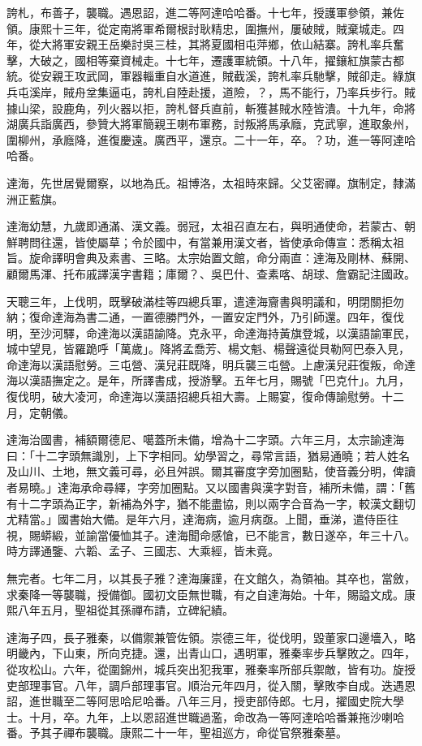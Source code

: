\begin{pinyinscope}
誇札，布善子，襲職。遇恩詔，進二等阿達哈哈番。十七年，授護軍參領，兼佐領。康熙十三年，從定南將軍希爾根討耿精忠，圍撫州，屢破賊，賊棄城走。四年，從大將軍安親王岳樂討吳三桂，其將夏國相屯萍鄉，依山結寨。誇札率兵奮擊，大破之，國相等棄資械走。十七年，遷護軍統領。十八年，擢鑲紅旗蒙古都統。從安親王攻武岡，軍器輜重自水道進，賊截溪，誇札率兵馳擊，賊卻走。綠旗兵屯溪岸，賊舟坌集逼屯，誇札自陸赴援，道險，？，馬不能行，乃率兵步行。賊據山梁，設鹿角，列火器以拒，誇札督兵直前，斬獲甚賊水陸皆潰。十九年，命將湖廣兵詣廣西，參贊大將軍簡親王喇布軍務，討叛將馬承廕，克武寧，進取象州，圍柳州，承廕降，進復慶遠。廣西平，還京。二十一年，卒。？功，進一等阿達哈哈番。

達海，先世居覺爾察，以地為氏。祖博洛，太祖時來歸。父艾密禪。旗制定，隸滿洲正藍旗。

達海幼慧，九歲即通滿、漢文義。弱冠，太祖召直左右，與明通使命，若蒙古、朝鮮聘問往還，皆使屬草；令於國中，有當兼用漢文者，皆使承命傳宣：悉稱太祖旨。旋命譯明會典及素書、三略。太宗始置文館，命分兩直：達海及剛林、蘇開、顧爾馬渾、托布戚譯漢字書籍；庫爾？、吳巴什、查素喀、胡球、詹霸記注國政。

天聰三年，上伐明，既擊破滿桂等四總兵軍，遣達海齎書與明議和，明閉關拒勿納；復命達海為書二通，一置德勝門外，一置安定門外，乃引師還。四年，復伐明，至沙河驛，命達海以漢語諭降。克永平，命達海持黃旗登城，以漢語諭軍民，城中望見，皆羅跪呼「萬歲」。降將孟喬芳、楊文魁、楊聲遠從貝勒阿巴泰入見，命達海以漢語慰勞。三屯營、漢兒莊既降，明兵襲三屯營。上慮漢兒莊復叛，命達海以漢語撫定之。是年，所譯書成，授游擊。五年七月，賜號「巴克什」。九月，復伐明，破大凌河，命達海以漢語招總兵祖大壽。上賜宴，復命傳諭慰勞。十二月，定朝儀。

達海治國書，補額爾德尼、噶蓋所未備，增為十二字頭。六年三月，太宗諭達海曰：「十二字頭無識別，上下字相同。幼學習之，尋常言語，猶易通曉；若人姓名及山川、土地，無文義可尋，必且舛誤。爾其審度字旁加圈點，使音義分明，俾讀者易曉。」達海承命尋繹，字旁加圈點。又以國書與漢字對音，補所未備，謂：「舊有十二字頭為正字，新補為外字，猶不能盡協，則以兩字合音為一字，較漢文翻切尤精當。」國書始大備。是年六月，達海病，逾月病亟。上聞，垂涕，遣侍臣往視，賜蟒緞，並諭當優恤其子。達海聞命感愴，已不能言，數日遂卒，年三十八。時方譯通鑒、六韜、孟子、三國志、大乘經，皆未竟。

無完者。七年二月，以其長子雅？達海廉謹，在文館久，為領袖。其卒也，當斂，求秦降一等襲職，授備御。國初文臣無世職，有之自達海始。十年，賜謚文成。康熙八年五月，聖祖從其孫禪布請，立碑紀績。

達海子四，長子雅秦，以備禦兼管佐領。崇德三年，從伐明，毀董家口邊墻入，略明畿內，下山東，所向克捷。還，出青山口，遇明軍，雅秦率步兵擊敗之。四年，從攻松山。六年，從圍錦州，城兵突出犯我軍，雅秦率所部兵禦敵，皆有功。旋授吏部理事官。八年，調戶部理事官。順治元年四月，從入關，擊敗李自成。迭遇恩詔，進世職至二等阿思哈尼哈番。八年三月，授吏部侍郎。七月，擢國史院大學士。十月，卒。九年，上以恩詔進世職過濫，命改為一等阿達哈哈番兼拖沙喇哈番。予其子禪布襲職。康熙二十一年，聖祖巡方，命從官祭雅秦墓。


\end{pinyinscope}
